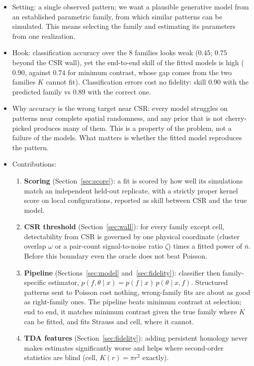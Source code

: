 \documentclass[twoside]{article}
\newcommand{\nb}{\bar n}
\begin{document}
\begin{itemize}
  \item Setting: a single observed pattern; we want a plausible generative model from an established parametric
        family, from which similar patterns can be simulated. This means selecting the family and estimating its
        parameters from one realization.
  \item Hook: classification accuracy over the 8 families looks weak ($0.45$; $0.75$ beyond the CSR wall), yet the
        end-to-end skill of the fitted models is high ($0.90$, against $0.74$ for minimum contrast, whose gap comes
        from the two families $K$ cannot fit). Classification errors cost no fidelity: skill $0.90$ with the
        predicted family vs $0.89$ with the correct one.
  \item Why accuracy is the wrong target near CSR: every model struggles on patterns near complete spatial randomness,
        and any prior that is not cherry-picked produces many of them. This is a property of the problem, not a
        failure of the models. What matters is whether the fitted model reproduces the pattern.
  \item Contributions:
  \begin{enumerate}
    \item \textbf{Scoring} (Section~\ref{sec:score}): a fit is scored by how well its simulations match an independent held-out
          replicate, with a strictly proper kernel score on local configurations, reported as skill between CSR
          and the true model.
    \item \textbf{CSR threshold} (Section~\ref{sec:wall}): for every family except cell, detectability from CSR is governed by one
          physical coordinate (cluster overlap $\omega$ or a pair-count signal-to-noise ratio $\zeta$) times a fitted
          power of $\nb$. Before this boundary even the oracle does not beat Poisson.
    \item \textbf{Pipeline} (Sections~\ref{sec:model} and~\ref{sec:fidelity}): classifier then family-specific estimator,
          $p(f,\theta\mid x)=p(f\mid x)\,p(\theta\mid x,f)$. Structured patterns sent to Poisson cost nothing,
          wrong-family fits are about as good as right-family ones. The pipeline beats minimum contrast at
          selection; end to end, it matches minimum contrast given the true family where $K$ can be fitted, and
          fits Strauss and cell, where it cannot.
    \item \textbf{TDA features} (Section~\ref{sec:fidelity}): adding persistent homology never makes estimates significantly worse and
          helps where second-order statistics are blind (cell, $K(r)=\pi r^2$ exactly).
  \end{enumerate}
\end{itemize}
\end{document}

